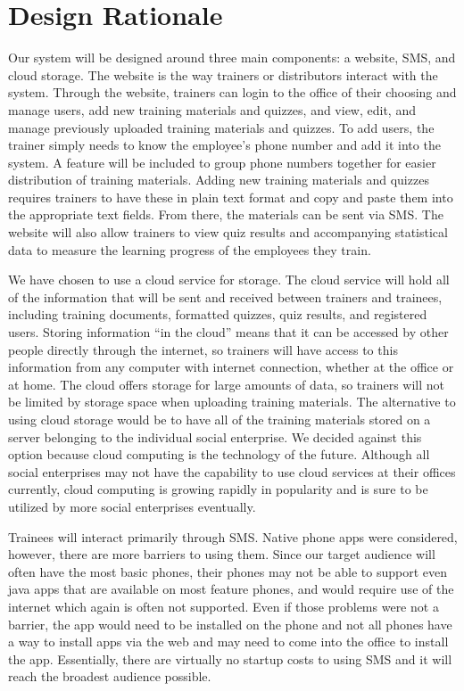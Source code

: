 \section{Design Rationale}
Our system will be designed around three main components: a website, SMS, and cloud storage. The website is the way trainers or distributors interact with the system. Through the website, trainers can login to the office of their choosing and manage users, add new training materials and quizzes, and view, edit, and manage previously uploaded training materials and quizzes. To add users, the trainer simply needs to know the employee’s phone number and add it into the system. A feature will be included to group phone numbers together for easier distribution of training materials. Adding new training materials and quizzes requires trainers to have these in plain text format and copy and paste them into the appropriate text fields. From there, the materials can be sent via SMS. The website will also allow trainers to view quiz results and accompanying statistical data to measure the learning progress of the employees they train. 

We have chosen to use a cloud service for storage. The cloud service will hold all of the information that will be sent and received between trainers and trainees, including training documents, formatted quizzes, quiz results, and registered users. Storing information “in the cloud” means that it can be accessed by other people directly through the internet, so trainers will have access to this information from any computer with internet connection, whether at the office or at home. The cloud offers storage for large amounts of data, so trainers will not be limited by storage space when uploading training materials. The alternative to using cloud storage would be to have all of the training materials stored on a server belonging to the individual social enterprise. We decided against this option because cloud computing is the technology of the future. Although all social enterprises may not have the capability to use cloud services at their offices currently, cloud computing is growing rapidly in popularity and is sure to be utilized by more social enterprises eventually.

Trainees will interact primarily through SMS. Native phone apps were considered, however, there are more barriers to using them. Since our target audience will often have the most basic phones, their phones may not be able to support even java apps that are available on most feature phones, and would require use of the internet which again is often not supported. Even if those problems were not a barrier, the app would need to be installed on the phone and not all phones have a way to install apps via the web and may need to come into the office to install the app. Essentially, there are virtually no startup costs to using SMS and it will reach the broadest audience possible.

